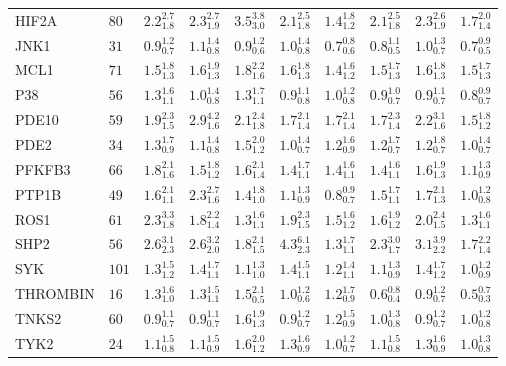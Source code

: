 \begin{tabular}{llllllllll}
HIF2A       &    $80$ &  $2.2_{1.8}^{2.7}$ &  $2.3_{1.9}^{2.7}$ &  $3.5_{3.0}^{3.8}$ &  $2.1_{1.8}^{2.5}$ &  $1.4_{1.2}^{1.8}$ &  $2.1_{1.8}^{2.5}$ &     $2.3_{1.9}^{2.6}$ &  $1.7_{1.4}^{2.0}$ \\
JNK1        &    $31$ &  $0.9_{0.7}^{1.2}$ &  $1.1_{0.8}^{1.4}$ &  $0.9_{0.6}^{1.2}$ &  $1.0_{0.8}^{1.4}$ &  $0.7_{0.6}^{0.8}$ &  $0.8_{0.5}^{1.1}$ &     $1.0_{0.7}^{1.3}$ &  $0.7_{0.5}^{0.9}$ \\
MCL1        &    $71$ &  $1.5_{1.3}^{1.8}$ &  $1.6_{1.3}^{1.9}$ &  $1.8_{1.6}^{2.2}$ &  $1.6_{1.3}^{1.8}$ &  $1.4_{1.2}^{1.6}$ &  $1.5_{1.3}^{1.7}$ &     $1.6_{1.3}^{1.8}$ &  $1.5_{1.3}^{1.7}$ \\
P38         &    $56$ &  $1.3_{1.1}^{1.6}$ &  $1.0_{0.8}^{1.4}$ &  $1.3_{1.1}^{1.7}$ &  $0.9_{0.8}^{1.1}$ &  $1.0_{0.8}^{1.2}$ &  $0.9_{0.7}^{1.0}$ &     $0.9_{0.7}^{1.1}$ &  $0.8_{0.7}^{0.9}$ \\
PDE10       &    $59$ &  $1.9_{1.5}^{2.3}$ &  $2.9_{1.6}^{4.2}$ &  $2.1_{1.8}^{2.4}$ &  $1.7_{1.4}^{2.1}$ &  $1.7_{1.4}^{2.1}$ &  $1.7_{1.4}^{2.3}$ &     $2.2_{1.6}^{3.1}$ &  $1.5_{1.2}^{1.8}$ \\
PDE2        &    $34$ &  $1.3_{0.9}^{1.7}$ &  $1.1_{0.8}^{1.4}$ &  $1.5_{1.2}^{2.0}$ &  $1.0_{0.7}^{1.4}$ &  $1.2_{0.9}^{1.6}$ &  $1.2_{0.7}^{1.7}$ &     $1.2_{0.7}^{1.8}$ &  $1.0_{0.7}^{1.4}$ \\
PFKFB3      &    $66$ &  $1.8_{1.6}^{2.1}$ &  $1.5_{1.2}^{1.8}$ &  $1.6_{1.4}^{2.1}$ &  $1.4_{1.1}^{1.7}$ &  $1.4_{1.1}^{1.6}$ &  $1.4_{1.1}^{1.6}$ &     $1.6_{1.3}^{1.9}$ &  $1.1_{0.9}^{1.3}$ \\
PTP1B       &    $49$ &  $1.6_{1.1}^{2.1}$ &  $2.3_{1.6}^{2.7}$ &  $1.4_{1.0}^{1.8}$ &  $1.1_{0.9}^{1.3}$ &  $0.8_{0.7}^{0.9}$ &  $1.5_{1.1}^{1.7}$ &     $1.7_{1.3}^{2.1}$ &  $1.0_{0.8}^{1.2}$ \\
ROS1        &    $61$ &  $2.3_{1.8}^{3.3}$ &  $1.8_{1.4}^{2.2}$ &  $1.3_{1.1}^{1.6}$ &  $1.9_{1.5}^{2.3}$ &  $1.5_{1.2}^{1.6}$ &  $1.6_{1.2}^{1.9}$ &     $2.0_{1.5}^{2.4}$ &  $1.3_{1.1}^{1.6}$ \\
SHP2        &    $56$ &  $2.6_{2.3}^{3.1}$ &  $2.6_{2.0}^{3.2}$ &  $1.8_{1.5}^{2.1}$ &  $4.3_{2.3}^{6.1}$ &  $1.3_{1.1}^{1.7}$ &  $2.3_{1.7}^{3.0}$ &     $3.1_{2.2}^{3.9}$ &  $1.7_{1.4}^{2.2}$ \\
SYK         &   $101$ &  $1.3_{1.2}^{1.5}$ &  $1.4_{1.1}^{1.7}$ &  $1.1_{1.0}^{1.3}$ &  $1.4_{1.1}^{1.5}$ &  $1.2_{1.1}^{1.4}$ &  $1.1_{0.9}^{1.3}$ &     $1.4_{1.2}^{1.7}$ &  $1.0_{0.9}^{1.2}$ \\
THROMBIN    &    $16$ &  $1.3_{1.0}^{1.6}$ &  $1.3_{1.1}^{1.5}$ &  $1.5_{0.5}^{2.1}$ &  $1.0_{0.6}^{1.2}$ &  $1.2_{0.9}^{1.7}$ &  $0.6_{0.4}^{0.8}$ &     $0.9_{0.7}^{1.2}$ &  $0.5_{0.3}^{0.7}$ \\
TNKS2       &    $60$ &  $0.9_{0.7}^{1.1}$ &  $0.9_{0.7}^{1.1}$ &  $1.6_{1.3}^{1.9}$ &  $0.9_{0.7}^{1.2}$ &  $1.2_{0.9}^{1.5}$ &  $1.0_{0.8}^{1.3}$ &     $0.9_{0.7}^{1.2}$ &  $1.0_{0.8}^{1.2}$ \\
TYK2        &    $24$ &  $1.1_{0.8}^{1.5}$ &  $1.1_{0.9}^{1.5}$ &  $1.6_{1.2}^{2.0}$ &  $1.3_{0.9}^{1.6}$ &  $1.0_{0.7}^{1.2}$ &  $1.1_{0.8}^{1.5}$ &     $1.3_{0.9}^{1.6}$ &  $1.0_{0.8}^{1.3}$ \\
\bottomrule
\end{tabular}
